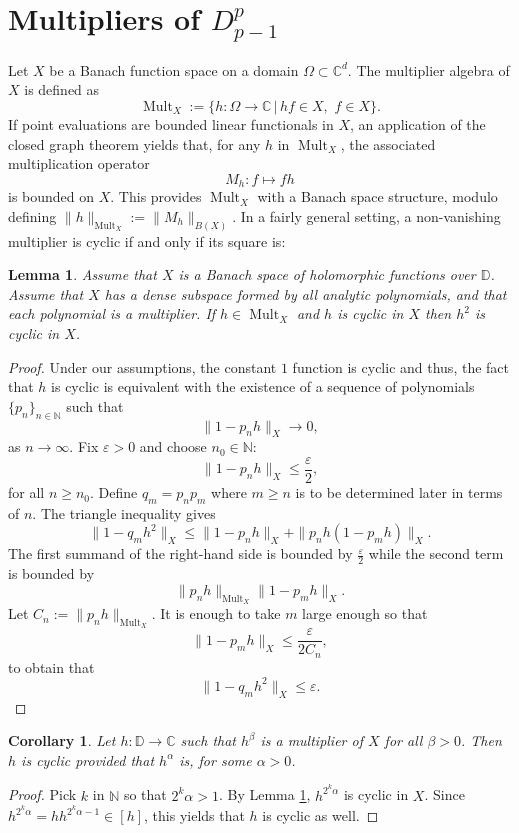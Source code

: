 \documentclass{birkjour}
\numberwithin{equation}{section}
\theoremstyle{plain}
\newtheorem{lemma}[theo]{Lemma}
\newtheorem{coro}[theo]{Corollary}
\theoremstyle{definition}
\newcommand{\D}{\mathbb{D}}
\newcommand{\Mult}{\operatorname{Mult}}
\newcommand{\C}{\mathbb{C}}
\newcommand{\N}{\mathbb{N}}
\newcommand{\1}{\mathds{1}}
\begin{document}
\section{Multipliers of $D^p_{p-1}$}
\label{sec:multipliers}
Let $X$ be a Banach function space on a domain $\Omega\subset\C^d$. The multiplier algebra of $X$ is defined as 
\[
\Mult_X:=\{h\colon\Omega\to\C\,|\, hf\in X, \,\,f\in X\}.
\]
If point evaluations are bounded linear functionals in $X$, an application of the closed graph theorem yields that, for any $h$ in $\Mult_X$, the associated multiplication operator
\[
M_h\colon f\mapsto fh
\]
is bounded on $X$. This provides $\Mult_X$ with a Banach space structure, modulo defining $\|h\|_{\Mult_X}:=\|M_h\|_{B(X)}$. In a fairly general setting, a non-vanishing multiplier is cyclic if and only if its square is:
\begin{lemma}
\label{lemma:multipliers}
Assume that $X$ is a Banach space of holomorphic functions over $\D$. Assume that $X$ has a dense subspace formed by all analytic polynomials, and that each polynomial is a multiplier.
If $h \in \Mult_X$ and $h$ is cyclic in $X$ then $h^2$ is cyclic in $X$. 
\end{lemma}
\begin{proof}
Under our assumptions, the constant $1$ function is cyclic and thus, the fact that $h$ is cyclic is equivalent with the existence of a sequence of polynomials $\{p_n\}_{n\in \N}$ such that \[\|1-p_n h\|_X \rightarrow 0,\] as $n\rightarrow \infty$. Fix $\varepsilon >0$ and choose $n_0 \in \N$: \[\|1-p_n h\|_X \leq \frac{\varepsilon}{2},\] for all $n\geq n_0$. Define $q_m =p_n p_m$ where $m \geq n$ is to be determined later in terms of $n$. The triangle inequality gives \[\|1-q_m h^2\|_X  \leq\|1-p_n h\|_X  + \|p_n h (1-p_m h)\|_X.\]
The first summand of the right-hand side is bounded by $\frac{\varepsilon}{2}$ while the second term is bounded by \[\|p_n h\|_{\Mult_X} \|1-p_m h\|_X.\]
Let $C_n:=\|p_nh\|_{\Mult_X}$. It is enough to take $m$ large enough so that 
\[\|1-p_m h\|_X \leq \frac{\varepsilon}{2C_n},\] to obtain that 
\[\|1-q_m h^2\|_X \leq \varepsilon.\]
\end{proof}
\begin{coro}
\label{coro:cyclic_mult}
Let $h\colon\D\to\C$ such that $h^\beta$ is a multiplier of $X$ for all $\beta>0$. Then $h$ is cyclic provided that $h^\alpha$ is, for some $\alpha>0$.
\end{coro}
\begin{proof}
Pick $k$ in $\N$ so that $2^k\alpha>1$. By Lemma \ref{lemma:multipliers}, $h^{2^k\alpha}$ is cyclic in $X$. Since $h^{2^k\alpha}=h h^{2^k\alpha-1}\in[h]$, this yields that $h$ is cyclic as well.
\end{proof}
\end{document}
